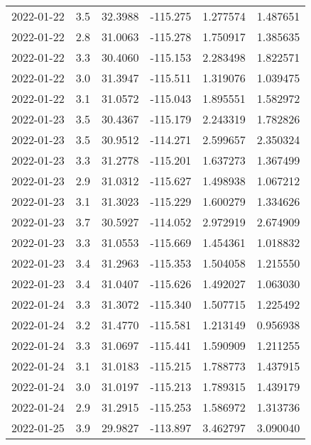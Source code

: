 \begin{tabular}{lrrrrr}
2022-01-22 &       3.5 &  32.3988 &  -115.275 &         1.277574 &         1.487651 \\
2022-01-22 &       2.8 &  31.0063 &  -115.278 &         1.750917 &         1.385635 \\
2022-01-22 &       3.3 &  30.4060 &  -115.153 &         2.283498 &         1.822571 \\
2022-01-22 &       3.0 &  31.3947 &  -115.511 &         1.319076 &         1.039475 \\
2022-01-22 &       3.1 &  31.0572 &  -115.043 &         1.895551 &         1.582972 \\
2022-01-23 &       3.5 &  30.4367 &  -115.179 &         2.243319 &         1.782826 \\
2022-01-23 &       3.5 &  30.9512 &  -114.271 &         2.599657 &         2.350324 \\
2022-01-23 &       3.3 &  31.2778 &  -115.201 &         1.637273 &         1.367499 \\
2022-01-23 &       2.9 &  31.0312 &  -115.627 &         1.498938 &         1.067212 \\
2022-01-23 &       3.1 &  31.3023 &  -115.229 &         1.600279 &         1.334626 \\
2022-01-23 &       3.7 &  30.5927 &  -114.052 &         2.972919 &         2.674909 \\
2022-01-23 &       3.3 &  31.0553 &  -115.669 &         1.454361 &         1.018832 \\
2022-01-23 &       3.4 &  31.2963 &  -115.353 &         1.504058 &         1.215550 \\
2022-01-23 &       3.4 &  31.0407 &  -115.626 &         1.492027 &         1.063030 \\
2022-01-24 &       3.3 &  31.3072 &  -115.340 &         1.507715 &         1.225492 \\
2022-01-24 &       3.2 &  31.4770 &  -115.581 &         1.213149 &         0.956938 \\
2022-01-24 &       3.3 &  31.0697 &  -115.441 &         1.590909 &         1.211255 \\
2022-01-24 &       3.1 &  31.0183 &  -115.215 &         1.788773 &         1.437915 \\
2022-01-24 &       3.0 &  31.0197 &  -115.213 &         1.789315 &         1.439179 \\
2022-01-24 &       2.9 &  31.2915 &  -115.253 &         1.586972 &         1.313736 \\
2022-01-25 &       3.9 &  29.9827 &  -113.897 &         3.462797 &         3.090040 \\

\end{tabular}
